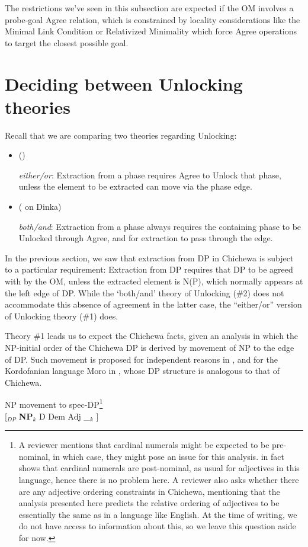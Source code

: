 \documentclass[output=paper,colorlinks,citecolor=brown]{langscibook}
\begin{document}
The restrictions we've seen in this subsection are expected if the OM involves a probe-goal Agree relation, which is constrained by locality considerations like the Minimal Link Condition \citep{Chomsky1995, Chomsky2000} or Relativized Minimality \citep{Rizzi1990} which force Agree operations to target the closest possible goal.

\section{Deciding between Unlocking theories}\label{sec:branan:4}

 Recall that we are comparing two theories regarding Unlocking:

\begin{itemize}
	\item[\#1] (\citealt{RackowskiRichards2005, Halpert2016, Halpert2019, Branan2018})

    \textit{either/or}: Extraction from a phase requires Agree to Unlock that phase, unless the element to be extracted can move via the phase edge.

    \item[\#2] (\citealt{VanUrkRichards2015} on Dinka)

    \textit{both/and}: Extraction from a phase always requires the containing phase to be Unlocked through Agree, and for extraction to pass through the edge.

\end{itemize}

In the previous section, we saw that extraction from DP in Chichewa is subject to a particular requirement: Extraction from DP requires that DP to be agreed with by the OM, unless the extracted element is N(P), which normally appears at the left edge of DP. While the `both/and' theory of Unlocking (\#2) does not accommodate this absence of agreement in the latter case, the ``either/or'' version of Unlocking theory (\#1) does.

Theory \#1 leads us to expect the Chichewa facts, given an analysis in which the NP-initial order of the Chichewa DP is derived by movement of NP to the edge of DP. Such movement is proposed for independent reasons in \citet{Cinque2005}, and for the Kordofanian language Moro in \citet{Jenks2010}, whose DP structure is analogous to that of Chichewa.

\ea%
    \label{ex:branan:17}
    NP movement to spec-DP\footnote{A reviewer mentions that cardinal numerals might be expected to be pre-nominal, in which case, they might pose an issue for this analysis. \citet{Mchombo2004} in fact shows that cardinal numerals are post-nominal, as usual for adjectives in this language, hence there is no problem here. A reviewer also asks whether there are any adjective ordering constraints in Chichewa, mentioning that the analysis presented here predicts the relative ordering of adjectives to be essentially the same as in a language like English. At the time of writing, we do not have access to information about this, so we leave this question aside for now.}\\
    {[$_{DP}$} \textbf{NP}$_{k}$ D Dem Adj \_$_{k}$ ]
\z
\end{document}
